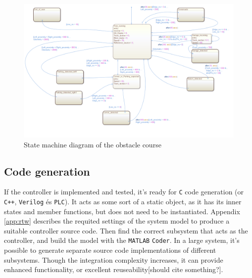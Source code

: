 \begin{figure}[!ht]
    \centering
    \includegraphics[width=\linewidth]{img/stateflow}
    \centering
    \caption{State machine diagram of the obstacle course}
    \label{fig:stateflow}
\end{figure}

\subsection{Code generation}

If the controller is implemented and tested, it's ready for \verb!C! code generation (or \verb!C++!, \verb!Verilog! és \verb!PLC!). It acts as some sort of a static object, as it has its inner states and member functions, but does not need to be instantiated. Appendix \ref{app:rtw} describes the requited settings of the system model to produce a suitable controller source code. Then find the correct subsystem that acts as the controller, and build the model with the \verb!MATLAB! \verb!Coder!. In a large system, it's possible to generate separate source code implementations of different subsystems. Though the integration complexity increases, it can provide enhanced functionality, or excellent reuseability[should cite something?].









